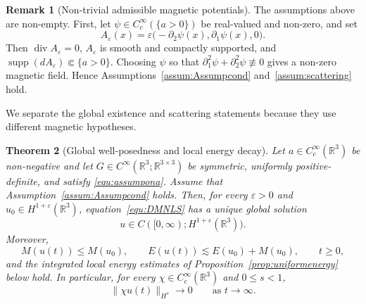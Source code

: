 \documentclass[10pt%
]{amsart}
\numberwithin{equation}{section}
\newcommand{\R}{\mathbb{R}}
\newtheorem{theorem}{Theorem}[section]
\theoremstyle{definition}
\newtheorem{remark}[theorem]{Remark}
\def\div{\mathop{\mathrm{div}}\nolimits}
\begin{document}
	\begin{remark}[Non-trivial admissible magnetic potentials]\label{rem:magnetic-examples}
		The assumptions above are non-empty. First, let $\psi\in C_c^\infty(\{a>0\})$ be real-valued and non-zero, and set
		\[
		A_\varepsilon(x)=\varepsilon\big(-\partial_2\psi(x),\partial_1\psi(x),0\big).
		\]
		Then $\div A_\varepsilon=0$, $A_\varepsilon$ is smooth and compactly supported, and $\operatorname{supp}(dA_\varepsilon)\Subset\{a>0\}$. Choosing $\psi$ so that $\partial_1^2\psi+\partial_2^2\psi\not\equiv0$ gives a non-zero magnetic field. Hence Assumptions~\ref{assum:Assumpcond} and~\ref{assum:scattering} hold.

	\end{remark}

	We separate the global existence and scattering statements because they use different magnetic hypotheses.
	\begin{theorem}[Global well-posedness and local energy decay]\label{T:gwp}
		Let $a\in C_c^\infty(\R^3)$ be non-negative and let $G\in C^\infty(\R^3;\R^{3\times3})$ be symmetric, uniformly positive-definite, and satisfy \eqref{equ:assumpona}. Assume that Assumption~\ref{assum:Assumpcond} holds. Then, for every $\varepsilon>0$ and $u_0\in H^{1+\varepsilon}(\R^3)$, equation~\eqref{equ:DMNLS} has a unique global solution
		\[
		u\in C([0,\infty);H^{1+\varepsilon}(\R^3)).
		\]
		Moreover,
		\[
		M(u(t))\le M(u_0),
		\qquad
		E(u(t))\lesssim E(u_0)+M(u_0),
		\qquad t\ge0,
		\]
		and the integrated local energy estimates of Proposition~\ref{prop:uniformenergy} below hold. In particular, for every $\chi\in C_c^\infty(\R^3)$ and $0\le s<1$,
		\[
		\|\chi u(t)\|_{H^s}\longrightarrow0
		\qquad\text{as }t\to\infty.
		\]
	\end{theorem}
\end{document}
